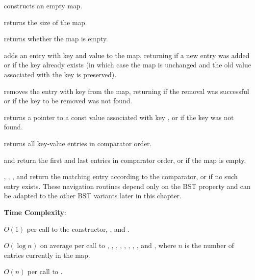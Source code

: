 \begin{compactitem}
  \item {} constructs an empty map.
  \item {} returns the size of the map.
  \item {} returns whether the map is empty.
  \item {} adds an entry with key  and value  to the map, returning  if a new entry was added or  if the key already exists (in which case the map is unchanged and the old value associated with the key is preserved).
  \item {} removes the entry with key  from the map, returning  if the removal was successful or  if the key to be removed was not found.
  \item {} returns a pointer to a const value associated with key , or  if the key was not found.
  \item {} returns all key-value entries in comparator order.
  \item {} and  return the first and last entries in comparator order, or  if the map is empty.
  \item {}, , , and  return the matching entry according to the comparator, or  if no such entry exists. These navigation routines depend only on the BST property and can be adapted to the other BST variants later in this chapter.
\end{compactitem}

\textbf{Time Complexity}:
\begin{compactitem}
  \item $O(1)$ per call to the constructor, , and .
  \item $O(\log n)$ on average per call to , , , , , , , , and , where $n$ is the number of entries currently in the map.
  \item $O(n)$ per call to .
\end{compactitem}

